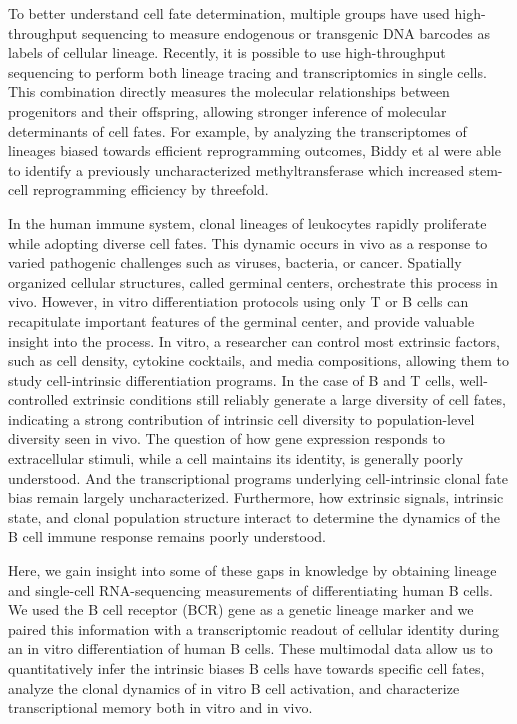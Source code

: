 To better understand cell fate determination, multiple groups have used high-throughput sequencing to measure endogenous or transgenic DNA barcodes as labels of cellular lineage\cite{lu_tracking_2011, naik_diverse_2013}. Recently, it is possible to use high-throughput sequencing to perform both lineage tracing and transcriptomics in single cells. This combination directly measures the molecular relationships between progenitors and their offspring, allowing stronger inference of molecular determinants of cell fates\cite{biddy_single-cell_2018, ludwig_lineage_2019, weinreb_lineage_2020}. For example, by analyzing the transcriptomes of lineages biased towards efficient reprogramming outcomes, Biddy et al were able to identify a previously uncharacterized methyltransferase which increased stem-cell reprogramming efficiency by threefold.

In the human immune system, clonal lineages of leukocytes rapidly proliferate while adopting diverse cell fates. This dynamic occurs in vivo as a response to varied pathogenic challenges such as viruses, bacteria, or cancer. Spatially organized cellular structures, called germinal centers, orchestrate this process in vivo. However, in vitro differentiation protocols using only T or B cells can recapitulate important features of the germinal center, and provide valuable insight into the process\cite{deenick_switching_1999}. In vitro, a researcher can control most extrinsic factors, such as cell density, cytokine cocktails, and media compositions, allowing them to study cell-intrinsic differentiation programs. In the case of B and T cells, well-controlled extrinsic conditions still reliably generate a large diversity of cell fates, indicating a strong contribution of intrinsic cell diversity to population-level diversity seen in vivo\cite{cheon_cyton2_2021}. The question of how gene expression responds to extracellular stimuli, while a cell maintains its identity, is generally poorly understood. And the transcriptional programs underlying cell-intrinsic clonal fate bias remain largely uncharacterized. Furthermore, how extrinsic signals, intrinsic state, and clonal population structure interact to determine the dynamics of the B cell immune response remains poorly understood.

Here, we gain insight into some of these gaps in knowledge by obtaining lineage and single-cell RNA-sequencing measurements of differentiating human B cells. We used the B cell receptor (BCR) gene as a genetic lineage marker and we paired this information with a transcriptomic readout of cellular identity during an in vitro differentiation of human B cells. These multimodal data allow us to quantitatively infer the intrinsic biases B cells have towards specific cell fates, analyze the clonal dynamics of in vitro B cell activation, and characterize transcriptional memory both in vitro and in vivo.

